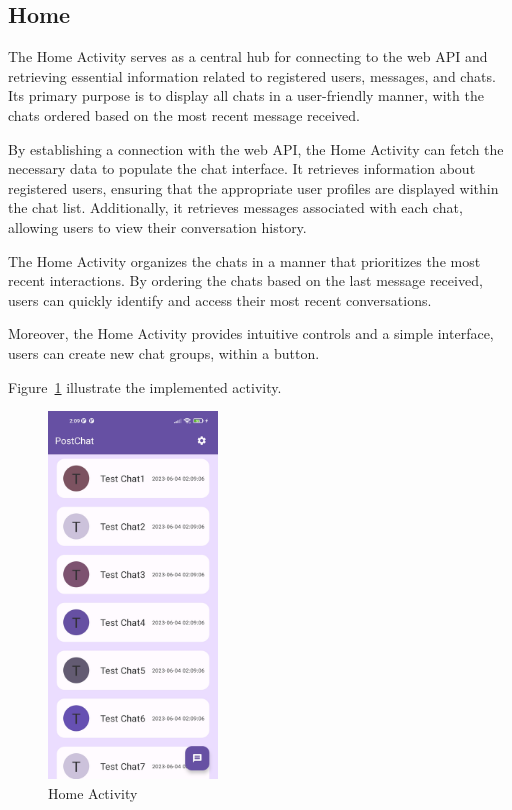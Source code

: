 \newpage

\subsection{Home}
The Home Activity serves as a central hub for connecting to the web API and retrieving essential information related to registered users, messages, and chats. Its primary purpose is to display all chats in a user-friendly manner, with the chats ordered based on the most recent message received.

By establishing a connection with the web API, the Home Activity can fetch the necessary data to populate the chat interface. It retrieves information about registered users, ensuring that the appropriate user profiles are displayed within the chat list. Additionally, it retrieves messages associated with each chat, allowing users to view their conversation history.

The Home Activity organizes the chats in a manner that prioritizes the most recent interactions. By ordering the chats based on the last message received, users can quickly identify and access their most recent conversations.

Moreover, the Home Activity provides intuitive controls and a simple interface, users can create new chat groups, within a button.

Figure~\ref{fig:HA1} illustrate the implemented activity.

\newpage

\begin{figure}[!ht]
	\centering
	\includegraphics[trim={0cm -3cm 0 -3cm}, width=0.4\textwidth]{./Chapter6/Figures/Home}
	\caption{Home Activity}
	\label{fig:HA1}
\end{figure}


